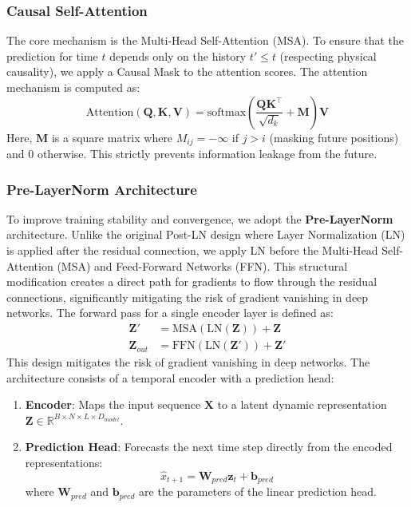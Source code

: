 \documentclass{article}
\begin{document}
\subsubsection{Causal Self-Attention}
The core mechanism is the Multi-Head Self-Attention (MSA). To ensure that the prediction for time $t$ depends only on the history $t' \le t$ (respecting physical causality), we apply a Causal Mask to the attention scores.
The attention mechanism is computed as:
\begin{equation}
\text{Attention}(\mathbf{Q}, \mathbf{K}, \mathbf{V}) = \text{softmax}\left(\frac{\mathbf{Q}\mathbf{K}^\top}{\sqrt{d_k}} + \mathbf{M}\right)\mathbf{V}
\end{equation}
Here, $\mathbf{M}$ is a square matrix where $M_{ij} = -\infty$ if $j > i$ (masking future positions) and $0$ otherwise. This strictly prevents information leakage from the future.
\subsubsection{Pre-LayerNorm Architecture}
To improve training stability and convergence, we adopt the \textbf{Pre-LayerNorm} architecture. Unlike the original Post-LN design where Layer Normalization (LN) is applied after the residual connection, we apply LN before the Multi-Head Self-Attention (MSA) and Feed-Forward Networks (FFN). This structural modification creates a direct path for gradients to flow through the residual connections, significantly mitigating the risk of gradient vanishing in deep networks.
The forward pass for a single encoder layer is defined as:
\begin{align}
\mathbf{Z}' &= \text{MSA}(\text{LN}(\mathbf{Z})) + \mathbf{Z} \\
\mathbf{Z}_{out} &= \text{FFN}(\text{LN}(\mathbf{Z}')) + \mathbf{Z}'
\end{align}
This design mitigates the risk of gradient vanishing in deep networks. The architecture consists of a temporal encoder with a prediction head:
\begin{enumerate}
    \item \textbf{Encoder}: Maps the input sequence $\mathbf{X}$ to a latent dynamic representation $\mathbf{Z} \in \mathbb{R}^{B \times N \times L \times D_{model}}$.
    \item \textbf{Prediction Head}: Forecasts the next time step directly from the encoded representations:
    \begin{equation}
    \hat{x}_{t+1} = \mathbf{W}_{pred} \mathbf{z}_{t} + \mathbf{b}_{pred}
    \end{equation}
    where $\mathbf{W}_{pred}$ and $\mathbf{b}_{pred}$ are the parameters of the linear prediction head.
\end{enumerate}
\end{document}
